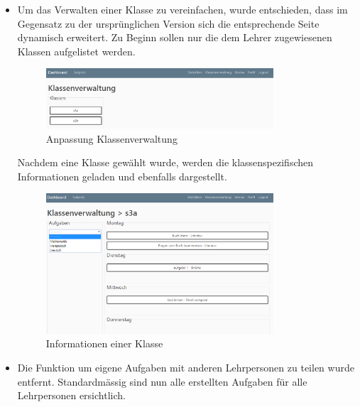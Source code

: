 	\newpage

\begin{itemize}
	\item Um das Verwalten einer Klasse zu vereinfachen, wurde entschieden, dass im Gegensatz zu der ursprünglichen Version sich die entsprechende Seite dynamisch erweitert. Zu Beginn sollen nur die dem Lehrer zugewiesenen Klassen aufgelistet werden. \\
	
	\begin{figure}[H]
	\begin{center}
	
		\includegraphics[width=0.8\textwidth, height=\textheight, keepaspectratio]{images/Webseite/Klassenverwaltung_Desktop.png}
		\caption{Anpassung Klassenverwaltung}
		\end{center}
\end{figure}

Nachdem eine Klasse gewählt wurde, werden die klassenspezifischen Informationen geladen und ebenfalls dargestellt. \\

	\begin{figure}[H]
				\begin{center}
\includegraphics[width=0.8\textwidth, height=\textheight, keepaspectratio]{images/Webseite/Klassenverwaltung_Klasse_Desktop.png}
		\caption{Informationen einer Klasse}
		\end{center}
\end{figure}

\bigskip

	\item Die Funktion um eigene Aufgaben mit anderen Lehrpersonen zu teilen wurde entfernt. Standardmässig sind nun alle erstellten Aufgaben für alle Lehrpersonen ersichtlich.
\end{itemize}

